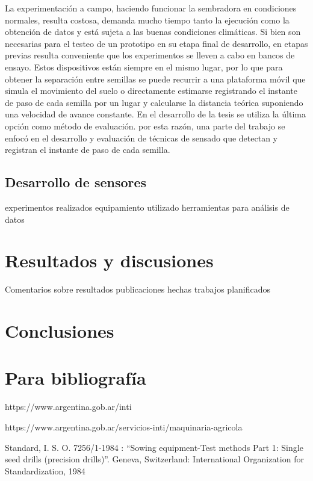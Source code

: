 \documentclass[12pt]{article}
\begin{document}
	La experimentación a campo, haciendo funcionar la sembradora en condiciones normales, resulta costosa, demanda mucho tiempo tanto la ejecución como la obtención de datos y está sujeta a las buenas condiciones climáticas. Si bien son necesarias para el testeo de un prototipo en su etapa final de desarrollo, en etapas previas resulta conveniente que los experimentos se lleven a cabo en bancos de ensayo. Estos dispositivos están siempre en el mismo lugar, por lo que para obtener la separación entre semillas se puede recurrir a una plataforma móvil que simula el movimiento del suelo o directamente estimarse registrando el instante de paso de cada semilla por un lugar y calcularse la distancia teórica suponiendo una velocidad de avance constante. En el desarrollo de la tesis se utiliza la última opción como método de evaluación.
	por esta razón, una parte del trabajo se enfocó en el desarrollo y evaluación de técnicas de sensado que detectan y registran el instante de paso de cada semilla.	
	
	\subsection{Desarrollo de sensores}
    
    
	
    experimentos realizados
    equipamiento utilizado
    herramientas para análisis de datos    
    
    
    \section{Resultados y discusiones}
    
    Comentarios sobre resultados
    publicaciones hechas
    trabajos planificados
    
    
	\section{Conclusiones}
	
	\section{Para bibliografía}
	

	
    
    
    \begin{thebibliography}{8}

    https://www.argentina.gob.ar/inti

    https://www.argentina.gob.ar/servicios-inti/maquinaria-agricola
    
     Standard, I. S. O. 7256/1-1984 : ``Sowing equipment-Test methods Part 1: Single seed drills (precision drills)''. Geneva, Switzerland: International Organization for Standardization, 1984
    \end{thebibliography}
    
\end{document}
